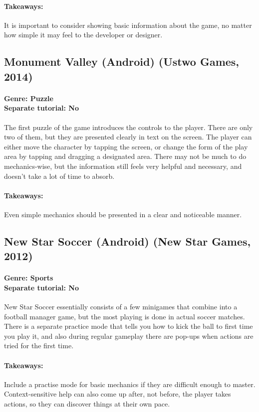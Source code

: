 \paragraph{Takeaways:}
It is important to consider showing basic information about the game, no matter how simple it may feel to the developer or designer.

\subsection{Monument Valley (Android) (Ustwo Games, 2014)}
\paragraph{Genre: Puzzle \\ Separate tutorial: No \\}
The first puzzle of the game introduces the controls to the player. There are only two of them, but they are presented clearly in text on the screen. The player can either move the character by tapping the screen, or change the form of the play area by tapping and dragging a designated area. There may not be much to do mechanics-wise, but the information still feels very helpful and necessary, and doesn't take a lot of time to absorb.
\paragraph{Takeaways:}
Even simple mechanics should be presented in a clear and noticeable manner.

\subsection{New Star Soccer (Android) (New Star Games, 2012)}
\paragraph{Genre: Sports \\ Separate tutorial: No \\}
New Star Soccer essentially consists of a few minigames that combine into a football manager game, but the most playing is done in actual soccer matches. There is a separate practice mode that tells you how to kick the ball to first time you play it, and also during regular gameplay there are pop-ups when actions are tried for the first time.
\paragraph{Takeaways:}
Include a practise mode for basic mechanics if they are difficult enough to master.
Context-sensitive help can also come up after, not before, the player takes actions, so they can discover things at their own pace.

